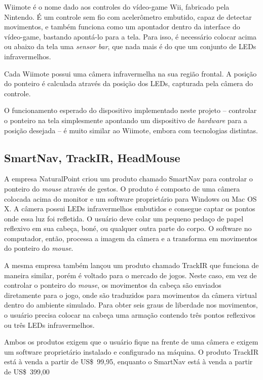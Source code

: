 \documentclass[brazil,pagestart=firstchapter]{abnt}
\begin{document}
Wiimote é o nome dado aos controles do vídeo-game Wii, fabricado pela
Nintendo. É um controle sem fio com acelerômetro embutido, capaz de detectar
movimentos, e também funciona como um apontador dentro da interface do
vídeo-game, bastando apontá-lo para a tela. Para isso, é necessário colocar
acima ou abaixo da tela uma \textit{sensor bar}, que nada mais é do que um
conjunto de \acsp{LED} infravermelhos. \cite{WikipediaWiimote}

Cada Wiimote possui uma câmera infravermelha na sua região frontal. A
posição do ponteiro é calculada através da posição dos \acsp{LED}, capturada
pela câmera do controle.

O funcionamento esperado do dispositivo implementado neste projeto --
controlar o ponteiro na tela simplesmente apontando um dispositivo de
\textit{hardware} para a posição desejada -- é muito similar ao Wiimote,
embora com tecnologias distintas.


\subsection{SmartNav, TrackIR, HeadMouse}
\label{sub:naturalpoint}

A empresa NaturalPoint criou um produto chamado SmartNav \cite{SmartNav}
para controlar o ponteiro do \textit{mouse} através de gestos. O produto é
composto de uma câmera colocada acima do monitor e um software proprietário
para Windows ou Mac OS X. A câmera possui \acsp{LED} infravermelhos
embutidos e consegue captar os pontos onde essa luz foi refletida. O usuário
deve colar um pequeno pedaço de papel reflexivo em sua cabeça, boné, ou
qualquer outra parte do corpo. O software no computador, então, processa a
imagem da câmera e a transforma em movimentos do ponteiro do \textit{mouse}.

A mesma empresa também lançou um produto chamado TrackIR \cite{TrackIR} que
funciona de maneira similar, porém é voltado para o mercado de jogos. Neste
caso, em vez de controlar o ponteiro do \textit{mouse}, os movimentos da
cabeça são enviados diretamente para o jogo, onde são traduzidos para
movimentos da câmera virtual dentro do ambiente simulado. Para obter seis
graus de liberdade nos movimentos, o usuário precisa colocar na cabeça uma
armação contendo três pontos reflexivos ou três \acsp{LED} infravermelhos.

Ambos os produtos exigem que o usuário fique na frente de uma câmera e
exigem um software proprietário instalado e configurado na máquina. O
produto TrackIR está à venda a partir de US\$~99,95, enquanto o SmartNav
está à venda a partir de US\$~399,00
\end{document}
